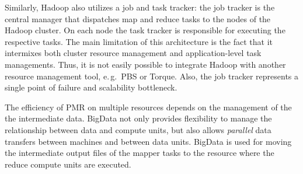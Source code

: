 \documentclass{acm_proc_article-sp}
\newcommand{\alnote}[1]{ {\textcolor{blue} { ***andreL: #1 }}}
\newcommand{\alnote}[1]{}
\newcommand{\pilotmapreduce}{Pilot-MapReduce\xspace}
\begin{document}
% 

Similarly, Hadoop also utilizes a job and task tracker: the job
tracker is the central manager that dispatches map and reduce tasks to
the nodes of the Hadoop cluster. On each node the task tracker is
responsible for executing the respective tasks. The main limitation of
this architecture is the fact that it intermixes both cluster resource
management and application-level task managements. Thus, it is not
easily possible to integrate Hadoop with another resource management
tool, e.\,g.\ PBS or Torque. Also, the job tracker represents a single
point of failure and scalability bottleneck.


The efficiency of PMR  on multiple resources depends on
the management of the the intermediate data. BigData not only
provides flexibility to manage the relationship between data and
compute units, but also allows {\it parallel} data transfers between
machines and between data units.  BigData is used for moving the
intermediate output files of the mapper tasks to the resource where
the reduce compute units are executed. 


% 
\end{document}
